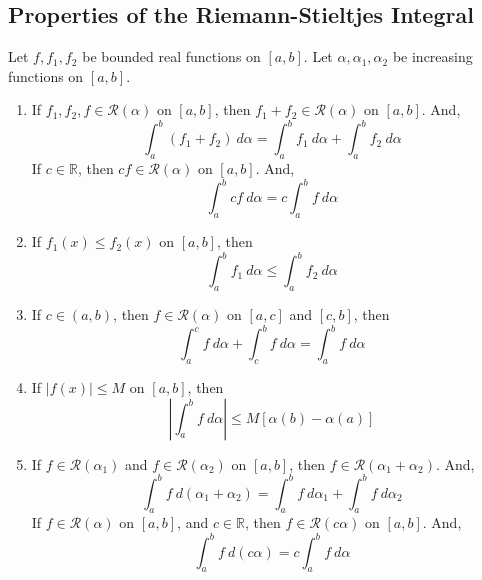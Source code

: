 \subsection{Properties of the Riemann-Stieltjes Integral}
\begin{theorem}
	Let $f,f_1,f_2$ be bounded real functions on $[a,b]$.
	Let $\alpha,\alpha_1,\alpha_2$ be increasing functions on $[a,b]$.
	\begin{enumerate}
		\item If $f_1,f_2,f \in \mathscr{R}(\alpha)$ on $[a,b]$, then $f_1+f_2 \in \mathscr{R}(\alpha)$ on $[a,b]$.
			And,
			\[ \int_a^b \left( f_1 + f_2 \right)\ d\alpha = \int_a^b f_1\ d\alpha + \int_a^b f_2\ d\alpha \]
			If $c \in \mathbb{R}$, then $cf \in \mathscr{R}(\alpha)$ on $[a,b]$.
			And,
			\[ \int_a^b cf\ d\alpha = c\int_a^b f\ d\alpha \]
		\item If $f_1(x) \le f_2(x)$ on $[a,b]$, then
			\[ \int_a^b f_1\ d\alpha \le \int_a^b f_2\ d\alpha \]
		\item If $c \in (a,b)$, then $f \in \mathscr{R}(\alpha)$ on $[a,c]$ and $[c,b]$, then
			\[ \int_a^c f\ d\alpha + \int_c^b f\ d\alpha = \int_a^b f\ d\alpha \]
		\item If $|f(x)| \le M$ on $[a,b]$, then 
			\[ \left| \int_a^b f\ d\alpha \right| \le M[\alpha(b)-\alpha(a)] \]
		\item If $f \in \mathscr{R}(\alpha_1)$ and $f \in \mathscr{R}(\alpha_2)$ on $[a,b]$, then $f \in \mathscr{R}(\alpha_1+\alpha_2)$.
			And,
			\[ \int_a^b f\ d(\alpha_1+\alpha_2) = \int_a^b f\ d\alpha_1 + \int_a^b f\ d\alpha_2 \]
			If $f \in \mathscr{R}(\alpha)$ on $[a,b]$, and $c \in \mathbb{R}$, then $f \in \mathscr{R}(c\alpha)$ on $[a,b]$.
			And,
			\[ \int_a^b f\ d(c\alpha) = c\int_a^b f\ d\alpha \]
	\end{enumerate}
\end{theorem}
